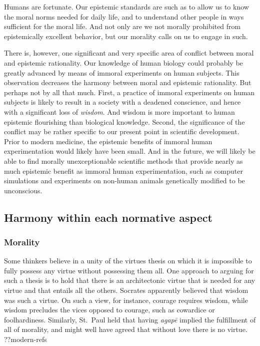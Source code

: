 Humans are fortunate. Our epistemic standards are such as to allow us to know the moral norms needed for daily life, 
and to understand other people in ways sufficient for the moral life. And not only are we not morally prohibited from 
epistemically excellent behavior, but our morality calls on us to engage in such.

There is, however, one significant and very specific area of conflict between moral and epistemic rationality. Our knowledge of human 
biology could probably be greatly advanced by means of immoral experiments on human subjects. This observation decreases
the harmony between moral and epistemic rationality. But perhaps not by all that much. First, a practice of immoral 
experiments on human subjects is likely to result in a society with a deadened conscience, and hence with a significant
loss of \textit{wisdom}. And wisdom is more important to human epistemic flourishing than biological knowledge. Second,
the significance of the conflict may be rather specific to our present point in scientific development. Prior to 
modern medicine, the epistemic benefits of immoral human experimentation would likely have been small. And in the 
future, we will likely be able to find morally unexceptionable scientific methods that provide nearly as much epistemic
benefit as immoral human experimentation, such as computer simulations and experiments on non-human animals genetically 
modified to be unconscious.

\subsection{Harmony within each normative aspect}
\subsubsection{Morality}
Some thinkers believe in a unity of the virtues thesis on which it is impossible to fully possess any virtue 
without possessing them all. One approach to arguing for such a thesis is to hold that there is an architectonic 
virtue that is needed for any virtue and that entails all the others. Socrates apparently believed that wisdom 
was such a virtue. On such a view, for instance, courage requires wisdom, while wisdom precludes the vices opposed 
to courage, such as cowardice or foolhardiness. Similarly, St.~Paul held that having \textit{agap\={e}} implied the 
fulfillment of all of morality, and might well have agreed that without love there is no virtue. ??modern-refs

